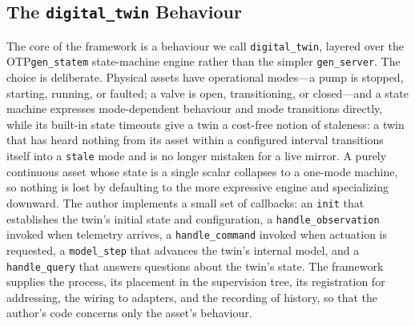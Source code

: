 \documentclass[conference]{IEEEtran}
\newcommand{\otp}{OTP\xspace}
\begin{document}
\subsection{The \texttt{digital\_twin} Behaviour}
The core of the framework is a behaviour we call \texttt{digital\_twin}, layered
over the \otp \texttt{gen\_statem} state-machine engine rather than the simpler
\texttt{gen\_server}. The choice is deliberate. Physical assets have operational
modes---a pump is stopped, starting, running, or faulted; a valve is open,
transitioning, or closed---and a state machine expresses mode-dependent
behaviour and mode transitions directly, while its built-in state timeouts give
a twin a cost-free notion of staleness: a twin that has heard nothing from its
asset within a configured interval transitions itself into a \texttt{stale} mode
and is no longer mistaken for a live mirror. A purely continuous asset whose
state is a single scalar collapses to a one-mode machine, so nothing is lost by
defaulting to the more expressive engine and specializing downward. The author
implements a small set of callbacks: an \texttt{init} that establishes the
twin's initial state and configuration, a \texttt{handle\_observation} invoked
when telemetry arrives, a \texttt{handle\_command} invoked when actuation is
requested, a \texttt{model\_step} that advances the twin's internal model, and a
\texttt{handle\_query} that answers questions about the twin's state. The
framework supplies the process, its placement in the supervision tree, its
registration for addressing, the wiring to adapters, and the recording of
history, so that the author's code concerns only the asset's behaviour.
\end{document}
